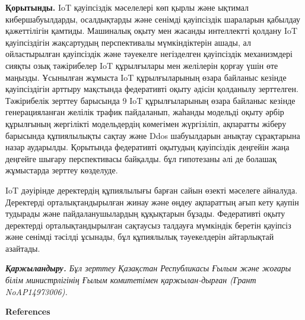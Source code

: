 \begin{multicols}{2}

{\bfseries Қорытынды.} IoT қауіпсіздік мәселелері көп қырлы және ықтимал
кибершабуылдарды, осалдықтарды және сенімді қауіпсіздік шараларын
қабылдау қажеттілігін
қамтиды.\hspace{0pt}\hspace{0pt}\hspace{0pt}\hspace{0pt}\hspace{0pt}\hspace{0pt}\hspace{0pt}
Машиналық оқыту мен жасанды интеллектті қолдану IoT қауіпсіздігін
жақсартудың перспективалы мүмкіндіктерін ашады, ал ойластырылған
қауіпсіздік және тәуекелге негізделген қауіпсіздік механизмдері сияқты
озық тәжірибелер IoT құрылғылары мен желілерін қорғау үшін өте маңызды.
Ұсынылған жұмыста IoT құрылғыларының өзара байланыс кезінде
қауіпсіздігін арттыру мақстында федеративті оқыту әдісін қолданылу
зерттелген. Тәжірибелік зерттеу барысында 9 IoT құрылғыларының өзара
байланыс кезінде генерацияланған желілік трафик пайдаланып, жаһанды
модельді оқыту әрбір құрылғының жергілікті модельдердің көмегімен
жүргізіліп, ақпаратты жіберу барысында құпиялылықты сақтау және Ddos
шабуылдарын анықтау сұрақтарына назар аударылды. Қорытында федеративті
оқытудың қауіпсіздік деңгейін жаңа деңгейге шығару перспективасы
байқалды. бұл гипотезаны әлі де болашақ жұмыстарда зерттеу көзделуде.

IoT дәуірінде деректердің құпиялылығы барған сайын өзекті мәселеге
айналуда. Деректерді орталықтандырылған жинау және өңдеу ақпараттың ағып
кету қаупін тудырады және пайдаланушылардың құқықтарын бұзады.
Федеративті оқыту деректерді орталықтандырылған сақтаусыз талдауға
мүмкіндік беретін қауіпсіз және сенімді тәсілді ұсынады, бұл құпиялылық
тәуекелдерін айтарлықтай азайтады.

\emph{{\bfseries Қаржыландыру.} Бұл зерттеу Қазақстан Республикасы Ғылым
және жоғары білім министрлігінің Ғылым комитетімен қаржылан-дырған (Грант
NoAP14973006).}
\end{multicols}



\begin{center}
  {\bfseries References}
  \end{center}

